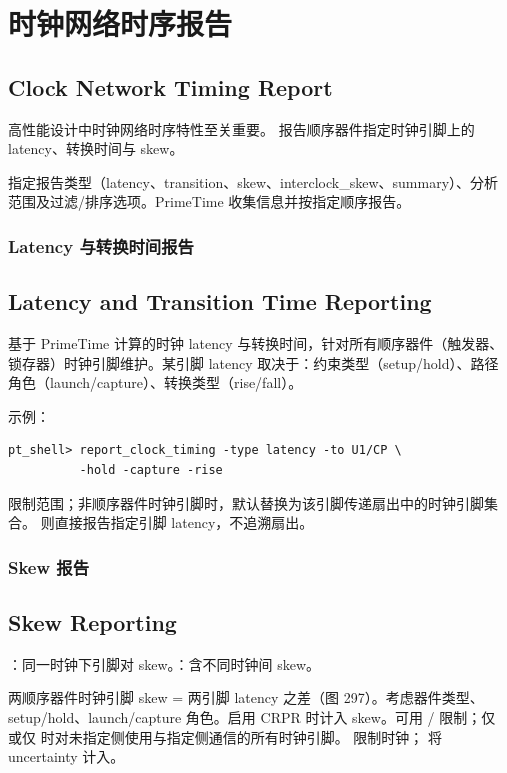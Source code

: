 \section{时钟网络时序报告}
\subsection*{Clock Network Timing Report}

高性能设计中时钟网络时序特性至关重要。 报告顺序器件指定时钟引脚上的 latency、转换时间与 skew。

指定报告类型（latency、transition、skew、interclock\_skew、summary）、分析范围及过滤/排序选项。PrimeTime 收集信息并按指定顺序报告。

\subsubsection{Latency 与转换时间报告}
\subsection*{Latency and Transition Time Reporting}

基于 PrimeTime 计算的时钟 latency 与转换时间，针对所有顺序器件（触发器、锁存器）时钟引脚维护。某引脚 latency 取决于：约束类型（setup/hold）、路径角色（launch/capture）、转换类型（rise/fall）。

示例：
\begin{lstlisting}
pt_shell> report_clock_timing -type latency -to U1/CP \
          -hold -capture -rise
\end{lstlisting}

 限制范围；非顺序器件时钟引脚时，默认替换为该引脚传递扇出中的时钟引脚集合。 则直接报告指定引脚 latency，不追溯扇出。

\subsubsection{Skew 报告}
\subsection*{Skew Reporting}

：同一时钟下引脚对 skew。：含不同时钟间 skew。

两顺序器件时钟引脚 skew = 两引脚 latency 之差（图 297）。考虑器件类型、setup/hold、launch/capture 角色。启用 CRPR 时计入 skew。可用 / 限制；仅  或仅  时对未指定侧使用与指定侧通信的所有时钟引脚。 限制时钟； 将 uncertainty 计入。

